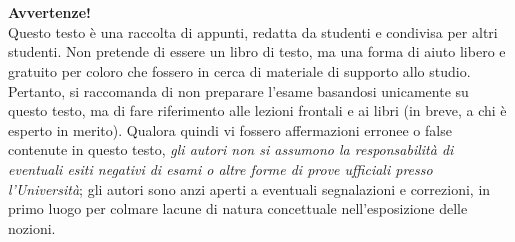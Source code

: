 \chapter*{}

\vspace*{0.3\paperheight}
\begin{center}
    \textbf{Avvertenze!}\\
    Questo testo è una raccolta di appunti, redatta da studenti e
    condivisa per altri studenti. Non pretende di essere un libro
    di testo, ma una forma di aiuto libero e gratuito per coloro
    che fossero in cerca di materiale di supporto allo studio.
    Pertanto, si raccomanda di non preparare l'esame basandosi unicamente
    su questo testo, ma di fare riferimento alle lezioni frontali
    e ai libri (in breve, a chi è esperto in merito). Qualora quindi
    vi fossero affermazioni erronee o false contenute in questo
    testo, \textit{gli autori non si assumono la responsabilità di eventuali
    esiti negativi di esami o altre forme di prove ufficiali presso
    l'Università}; gli autori sono anzi aperti a eventuali segnalazioni
    e correzioni, in primo luogo per colmare lacune di natura concettuale
    nell'esposizione delle nozioni.
\end{center}